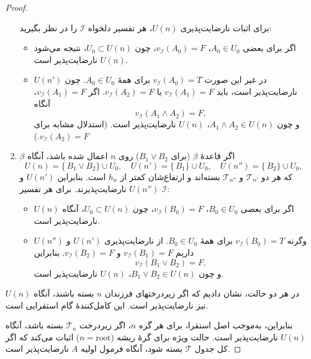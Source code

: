 \begin{proof}
\begin{enumerate}[1)]
      برای اثبات نارضایت‌پذیری \(U(n)\)، هر تفسیر دلخواه \(\mathscr{I}\) را در نظر بگیرید:
      \begin{itemize}
        \item اگر برای بعضی \(A_0\in U_0\)، \(v_{\mathscr{I}}(A_0)=F\)، چون \(U_0\subset U(n)\)، نتیجه می‌شود \(U(n)\) نارضایت‌پذیر است.
        \item در غیر این صورت \(v_{\mathscr{I}}(A_0)=T\) برای همهٔ \(A_0\in U_0\). چون \(U(n')\) نارضایت‌پذیر است، باید \(v_{\mathscr{I}}(A_1)=F\) یا \(v_{\mathscr{I}}(A_2)=F\).  
          اگر \(v_{\mathscr{I}}(A_1)=F\)، آنگاه
          \[
            v_{\mathscr{I}}(A_1\land A_2)=F,
          \]
          و چون \(A_1\land A_2\in U(n)\)، \(U(n)\) نارضایت‌پذیر است. (استدلال مشابه برای \(v_{\mathscr{I}}(A_2)=F\).)
      \end{itemize}
  
    \item \(\beta\)\;  
      اگر قاعدهٔ \(\beta\) (برای \(B_1\lor B_2\)) روی \(n\) اعمال شده باشد، آنگاه
      \[
        U(n)=\{\,B_1\lor B_2\}\cup U_0,\quad
        U(n')=\{\,B_1\}\cup U_0,\quad
        U(n'')=\{\,B_2\}\cup U_0,
      \]
      که هر دو \(\mathscr{T}_{n'}\) و \(\mathscr{T}_{n''}\) بسته‌اند و ارتفاع‌شان کمتر از \(h_n\) است. بنابراین \(U(n')\) و \(U(n'')\) نارضایت‌پذیرند.  
      برای هر تفسیر \(\mathscr{I}\):
      \begin{itemize}
        \item اگر برای بعضی \(B_0\in U_0\)، \(v_{\mathscr{I}}(B_0)=F\)، چون \(U_0\subset U(n)\)، آنگاه \(U(n)\) نارضایت‌پذیر است.
        \item وگرنه \(v_{\mathscr{I}}(B_0)=T\) برای همهٔ \(B_0\in U_0\).  
          از نارضایت‌پذیری \(U(n')\) و \(U(n'')\) داریم \(v_{\mathscr{I}}(B_1)=F\) و \(v_{\mathscr{I}}(B_2)=F\).  
          بنابراین
          \[
            v_{\mathscr{I}}(B_1\lor B_2)=F,
          \]
          و چون \(B_1\lor B_2\in U(n)\)، \(U(n)\) نارضایت‌پذیر است.
      \end{itemize}
  \end{enumerate}
  
  در هر دو حالت، نشان دادیم که اگر زیر‌درختهای فرزندان \(n\) بسته باشند، آنگاه \(U(n)\) نیز نارضایت‌پذیر است. این کامل‌کنندهٔ گام استقرایی است.
  
  بنابراین، به‌موجب اصل استقرا، برای هر گره \(n\)، اگر زیر‌درخت \(\mathscr{T}_n\) بسته باشد، آنگاه \(U(n)\) نارضایت‌پذیر است. حالت ویژه برای گرهٔ ریشه (\(n=\text{root}\)) اثبات می‌کند که اگر کل جدول \(\mathscr{T}\) بسته شود، آنگاه فرمول اولیه \(A\) نارضایت‌پذیر است.
  \end{proof}